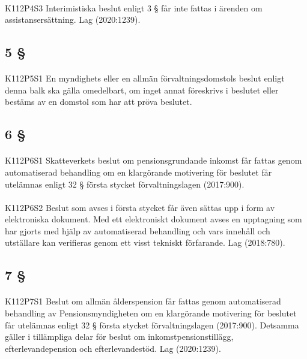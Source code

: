 \documentclass[a4paper,notitlepage,openany,10pt]{book}
\begin{document}
\paragraph*{}
{\tiny K112P4S3}
Interimistiska beslut enligt 3 § får inte fattas i ärenden om assistansersättning.
Lag (2020:1239).
\subsection*{5 §}
\paragraph*{}
{\tiny K112P5S1}
En myndighets eller en allmän förvaltningsdomstols beslut enligt denna balk ska gälla omedelbart, om inget annat föreskrivs i beslutet eller bestäms av en domstol som har att pröva beslutet.
\subsection*{6 §}
\paragraph*{}
{\tiny K112P6S1}
Skatteverkets beslut om pensionsgrundande inkomst får fattas genom automatiserad behandling om en klargörande motivering för beslutet får utelämnas enligt 32 § första stycket förvaltningslagen (2017:900).
\paragraph*{}
{\tiny K112P6S2}
Beslut som avses i första stycket får även sättas upp i form av elektroniska dokument. Med ett elektroniskt dokument avses en upptagning som har gjorts med hjälp av automatiserad behandling och vars innehåll och utställare kan verifieras genom ett visst tekniskt förfarande.
Lag (2018:780).
\subsection*{7 §}
\paragraph*{}
{\tiny K112P7S1}
Beslut om allmän ålderspension får fattas genom automatiserad behandling av Pensionsmyndigheten om en klargörande motivering för beslutet får utelämnas enligt 32 § första stycket förvaltningslagen (2017:900). Detsamma gäller i tillämpliga delar för beslut om inkomstpensionstillägg, efterlevandepension och efterlevandestöd.
Lag (2020:1239).
\end{document}
